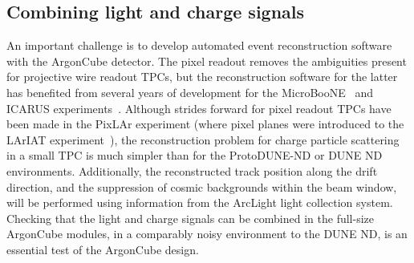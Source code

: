 \subsection{Combining light and charge signals}
An important challenge is to develop automated event reconstruction software with the ArgonCube detector. The pixel readout removes the ambiguities present for projective wire readout TPCs, but the reconstruction software for the latter has benefited from several years of development for the MicroBooNE~\cite{microboone} and ICARUS experiments~\cite{icarus}. Although strides forward for pixel readout TPCs have been made in the PixLAr experiment (where pixel planes were introduced to the LArIAT experiment~\cite{lariat}), the reconstruction problem for charge particle scattering in a small TPC is much simpler than for the ProtoDUNE-ND or DUNE ND environments. Additionally, the reconstructed track position along the drift direction, and the suppression of cosmic backgrounds within the beam window, will be performed using information from the ArcLight light collection system. Checking that the light and charge signals can be combined in the full-size ArgonCube modules, in a comparably noisy environment to the DUNE ND, is an essential test of the ArgonCube design.

